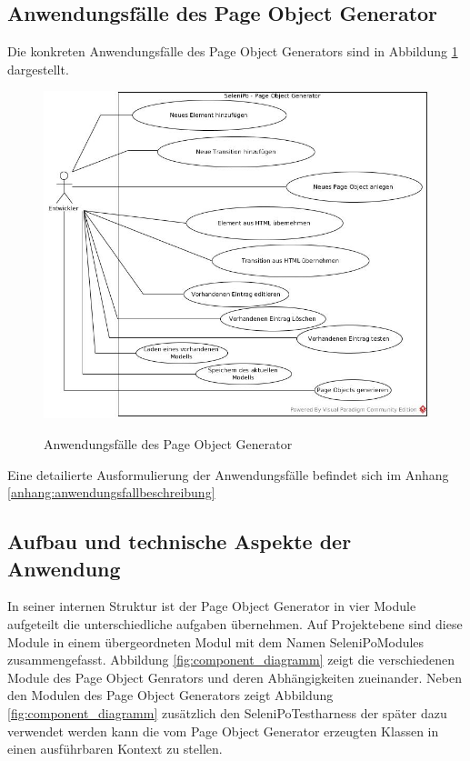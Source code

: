\subsection{Anwendungsfälle des Page Object Generator}
\label{sec:page_object_generator_usecases}

Die konkreten Anwendungsfälle des Page Object Generators sind in Abbildung \ref{fig:use_case} dargestellt.

\begin{figure}[htb]
  \centering  
  \includegraphics[scale=0.45]{img/Use-Cases.jpg}\\
  \caption{Anwendungsfälle des Page Object Generator}
  \label{fig:use_case}
\end{figure}

Eine detailierte Ausformulierung der Anwendungsfälle befindet sich im Anhang \ref{anhang:anwendungsfallbeschreibung}

\newpage

\subsection{Aufbau und technische Aspekte der Anwendung}
\label{sec:aufbau_des_systems}
In seiner internen Struktur ist der Page Object Generator in vier Module aufgeteilt die unterschiedliche aufgaben übernehmen. Auf Projektebene sind diese Module in einem übergeordneten Modul mit dem Namen SeleniPoModules zusammengefasst. Abbildung \ref{fig:component_diagramm} zeigt die verschiedenen Module des Page Object Genrators und deren Abhängigkeiten zueinander.
Neben den Modulen des Page Object Generators zeigt Abbildung \ref{fig:component_diagramm} zusätzlich den SeleniPoTestharness der später dazu verwendet werden kann die vom Page Object Generator erzeugten Klassen in einen ausführbaren Kontext zu stellen.

